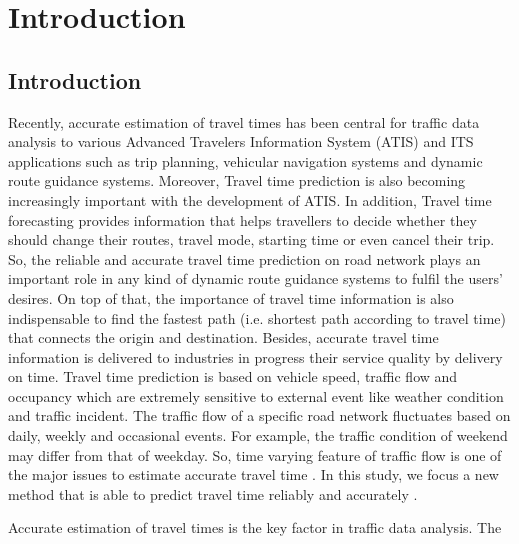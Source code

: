 \documentclass[12pt,report]{ucdavisthesis}
\begin{document}
    \newpage
   
    \setcounter{page}{1}
   
    \rhead{}
    \cfoot{}
    \rfoot[10pt]{\thepage}
   
    \chapter{Introduction}\label{chp:chapter}
    \section{Introduction}
     \hspace{2cm}Recently, accurate estimation of travel times has been central for traffic data analysis
     to various Advanced Travelers Information System (ATIS) and ITS applications
     such as trip planning, vehicular navigation systems and dynamic route guidance
     systems. Moreover, Travel time prediction is also becoming increasingly important
     with the development of ATIS. In addition, Travel time forecasting provides
     information that helps travellers to decide whether they should change their routes,
     travel mode, starting time or even cancel their trip. So, the reliable and accurate
     travel time prediction on road network plays an important role in any kind of
     dynamic route guidance systems to fulfil the users’ desires. On top of that, the
     importance of travel time information is also indispensable to find the fastest path
     (i.e. shortest path according to travel time) that connects the origin and destination.
     Besides, accurate travel time information is delivered to industries in progress their
     service quality by delivery on time. Travel time prediction is based on vehicle speed,
     traffic flow and occupancy which are extremely sensitive to external event like
     weather condition and traffic incident. The traffic flow of a specific road network
     fluctuates based on daily, weekly and occasional events. For example, the traffic
     condition of weekend may differ from that of weekday. So, time varying feature of
     traffic flow is one of the major issues to estimate accurate travel time . In this study,
     we focus a new method that is able to predict travel time reliably and accurately .
    \par\hspace{2cm}Accurate estimation of travel times is the key factor in traffic data analysis. The
\end{document}
